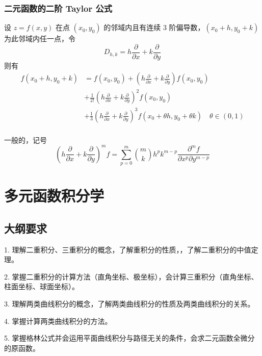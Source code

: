 \subsubsection*{二元函数的二阶 Taylor 公式}

\begin{theorem}
	设 $z = f(x, y)$ 在点 $(x_0, y_0)$ 的邻域内且有连续 $3$ 阶偏导数，$(x_0 + h, y_0 + k)$ 为此邻域内任一点，令
	\[ D_{h,k} = h \frac{\partial}{\partial x} + k \frac{\partial}{\partial y} \]
	则有
	\[
		\begin{aligned}
			f(x_0 + h, y_0 + k) & = f(x_0, y_0) + \left(h \frac{\partial}{\partial x} + k \frac{\partial}{\partial y}\right) f(x_0, y_0)                                               \\
			                    & + \frac{1}{2!} \left(h \frac{\partial}{\partial x} + k \frac{\partial}{\partial y}\right)^2 f(x_0, y_0)                                              \\
			                    & + \frac{1}{3} \left(h \frac{\partial}{\partial x} + k \frac{\partial}{\partial y}\right)^3 f(x_0 + \theta h, y_0 + \theta k) \quad \theta \in (0, 1) \\
		\end{aligned}
	\]
\end{theorem}

一般的，记号
\[ \left(h \frac{\partial}{\partial x} + k \frac{\partial}{\partial y}\right)^m f = \sum_{p=0}^{m} \binom{m}{k} h^p k^{m-p} \frac{\partial^m f}{\partial x^p \partial y^{m-p}} \]

\section{多元函数积分学}

\subsection{大纲要求}

1. 理解二重积分、三重积分的概念，了解重积分的性质，，了解二重积分的中值定理。

2. 掌握二重积分的计算方法（直角坐标、极坐标），会计算三重积分（直角坐标、柱面坐标、球面坐标）。

3. 理解两类曲线积分的概念，了解两类曲线积分的性质及两类曲线积分的关系。

4. 掌握计算两类曲线积分的方法。

5. 掌握格林公式并会运用平面曲线积分与路径无关的条件，会求二元函数全微分的原函数。

